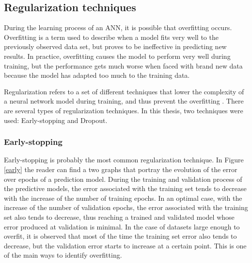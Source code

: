\subsection{Regularization techniques}

During the learning process of an \ac{ANN}, it is possible that overfitting occurs. Overfitting is a term used to describe when a model fits very well to the previously observed data set, but proves to be ineffective in predicting new results. In practice, overfitting causes the model to perform very well during training, but the performance gets much worse when faced with brand new data because the model has adapted too much to the training data.  

Regularization refers to a set of different techniques that lower the complexity of a neural network model during training, and thus prevent the overfitting \cite{reg0}. There are several types of regularization techniques. In this thesis, two techniques were used: Early-stopping and Dropout.

\subsubsection{Early-stopping}\label{sec:early}

Early-stopping is probably the most common regularization technique. In Figure \ref{early} the reader can find a two graphs that portray the evolution of the error over epochs of a prediction model. During the training and validation process of the predictive models, the error associated with the training set tends to decrease with the increase of the number of training epochs. In an optimal case, with the increase of the number of validation epochs, the error associated with the training set also tends to decrease, thus reaching a trained and validated model whose error produced at validation is minimal. In the case of datasets large enough to overfit, it is observed that most of the time the training set error also tends to decrease, but the validation error starts to increase at a certain point. This is one of the main ways to identify overfitting.


